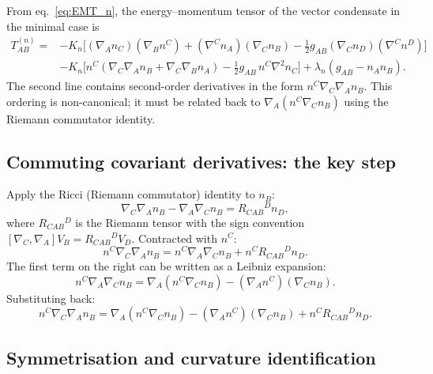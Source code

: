 \documentclass[11pt,a4paper]{article}
\numberwithin{equation}{section}
\begin{document}
From eq.~\eqref{eq:EMT_n}, the energy--momentum tensor of the
vector condensate in the minimal case is
\begin{align}
\label{eq:Tn_full}
T_{AB}^{(n)} =
&-K_n\bigl[
(\nabla_A n_C)(\nabla_B n^C)
+(\nabla^C n_A)(\nabla_C n_B)
-\tfrac{1}{2}g_{AB}(\nabla_C n_D)(\nabla^C n^D)
\bigr]
\nonumber\\
&-K_n\bigl[
n^C(\nabla_C\nabla_A n_B
+\nabla_C\nabla_B n_A)
-\tfrac{1}{2}g_{AB}\,n^C\nabla^2 n_C
\bigr]
+\lambda_n(g_{AB}-n_An_B).
\end{align}
The second line contains second-order derivatives in the form
$n^C\nabla_C\nabla_A n_B$.  This ordering is non-canonical;
it must be related back to $\nabla_A(n^C\nabla_C n_B)$ using
the Riemann commutator identity.

\subsection{Commuting covariant derivatives: the key step}

Apply the Ricci (Riemann commutator) identity to $n_B$:
\begin{equation}
\label{eq:ricci_identity}
\nabla_C\nabla_A n_B - \nabla_A\nabla_C n_B
= R_{CAB}{}^D n_D,
\end{equation}
where $R_{CAB}{}^D$ is the Riemann tensor with the sign convention
$[\nabla_C,\nabla_A]V_B = R_{CAB}{}^D V_D$.
Contracted with $n^C$:
\begin{equation}
n^C\nabla_C\nabla_A n_B
= n^C\nabla_A\nabla_C n_B + n^C R_{CAB}{}^D n_D.
\end{equation}
The first term on the right can be written as a Leibniz expansion:
\begin{equation}
n^C\nabla_A\nabla_C n_B
= \nabla_A(n^C\nabla_C n_B)
-(\nabla_A n^C)(\nabla_C n_B).
\end{equation}
Substituting back:
\begin{equation}
\label{eq:n_deriv_split}
n^C\nabla_C\nabla_A n_B
= \nabla_A(n^C\nabla_C n_B)
-(\nabla_A n^C)(\nabla_C n_B)
+ n^C R_{CAB}{}^D n_D.
\end{equation}

\subsection{Symmetrisation and curvature identification}
\end{document}
